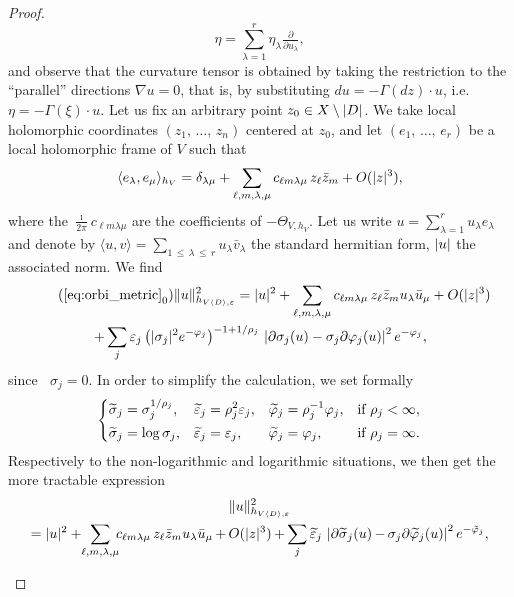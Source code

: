 \documentclass[10pt,a4paper]{article}
\DeclareMathOperator{\dbar}{\bar\partial}
\DeclarePairedDelimiter{\abs}{\lvert}{\rvert}
\DeclarePairedDelimiter{\Abs}{\lVert}{\rVert}
\let\leq\leqslant
\let\oldtilde\tilde
\renewcommand*{\tilde}[1]{\mathchoice{\widetilde{#1}}{\widetilde{#1}}{\oldtilde{#1}}{\oldtilde{#1}}}
\numberwithin{equation}{section}
\begin{document}
\begin{proof}
\[\eta=\sum_{\lambda=1}^r\eta_\lambda\tfrac{\partial}{\partial u_\lambda},
\]
and observe that the curvature tensor is obtained by taking the restriction to the ``parallel'' directions $\nabla u=0$, that is, by substituting $du=-\Gamma(dz)\cdot u$, i.e.\
$\eta=-\Gamma(\xi)\cdot u$. Let us fix an arbitrary point
$z_0\in X\setminus\abs{D}$. We take local holomorphic coordinates $(z_1,\,\dotsc,\,z_n)$ centered at $z_0$, and let $(e_1,\,\dotsc,\,e_r)$ be a local holomorphic frame of $V$ such that
\[
\langle e_\lambda,e_\mu\rangle_{h_V}=\delta_{\lambda\mu}+
\sum_{\ell,m,\lambda,\mu}c_{\ell m\lambda\mu}\,z_\ell\bar z_m+O(\abs{z}^3),
\]
where the $\tfrac{\imath}{ 2\pi}c_{\ell m\lambda\mu}$ are the coefficients of
$-\Theta_{V,h_V}$. Let us write $u=\sum_{\lambda=1}^ru_\lambda e_\lambda$ and denote by $\langle u,v\rangle=\sum_{1\,\leq\,\lambda\,\leq\,r}u_\lambda\bar v_\lambda$ the standard hermitian form, $\abs{u}$ the associated norm. We find
\begin{multline*}
\tag{$\ref{eq:orbi_metric}_{0}$}\label{6.4_0}
\Abs{u}_{h_{V\langle D\rangle,\varepsilon}}^2 =
\abs{u}^2+\sum_{\ell,m,\lambda,\mu}c_{\ell m\lambda\mu}\,z_\ell\bar z_m u_\lambda\bar u_\mu+O(\abs{z}^3)
\\
+\sum_j\varepsilon_j\,\big(\abs{\sigma_j}^2e^{-\varphi_j}\big)^{-1+1/\rho_j}\,
\left|\partial\sigma_j(u)-\sigma_j\partial\varphi_j(u)\right|^2 e^{-\varphi_j},
\end{multline*}
since $\dbar\sigma_j=0$. In order to simplify the calculation, we set formally
\[
\left\{
\begin{aligned}
\tilde\sigma_j&=\sigma_j^{1/\rho_j}, &
\tilde\varepsilon_j&=\rho_j^2\varepsilon_j, &
\tilde\varphi_j&=\rho_j^{-1}\varphi_j, &&
\text{if }\rho_j<\infty, \\
\tilde\sigma_j&=\log\sigma_j, &
\tilde\varepsilon_j&=\varepsilon_j, &
\tilde\varphi_j&=\varphi_j,\hfill &&
\text{if }\rho_j=\infty.
\end{aligned}
\right.
\]
Respectively to the non-logarithmic and logarithmic situations, we then get the more tractable expression
\begin{multline}
\Abs{u}_{h_{V\langle D\rangle,\varepsilon}}^2 \\
=\abs{u}^2+{}\kern-4pt
\sum_{\ell,m,\lambda,\mu}\kern-4pt c_{\ell m\lambda\mu}\,z_\ell\bar z_m u_\lambda\bar u_\mu\,{+}\,O(\abs{z}^3)
\,{+}\sum_j\tilde\varepsilon_j\,
\left|\partial\tilde\sigma_j(u)\,{-}\,\sigma_j\partial\tilde\varphi_j(u)\right|^2 e^{-\tilde\varphi_j},
\end{multline}
\begin{multline}

\end{multline}
\end{proof}
\end{document}
